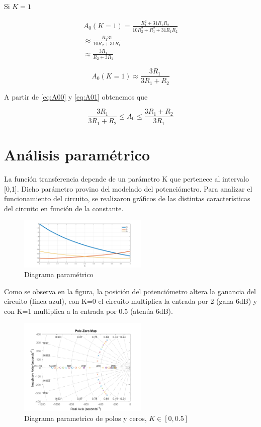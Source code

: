 \documentclass[../../tc_tp3_main.tex]{subfiles}
\begin{document}
Si $K=1$

\begin{equation}
\begin{split}
A_0(K=1) =\frac{R_1^2 + 31R_1 R_2}{10 R_2^2 +R_1^2+31R_1 R_2} \\
\approx \frac{R_1 31}{10 R_2 + 31 R_1} \\
 \approx \frac{3 R_1}{R_2 + 3 R_1}
\end{split}
\end{equation}

\begin{equation}
A_0(K=1) \approx \frac {3R_1}{3R_1 + R_2}\label{eq:A01}
\end{equation}

A partir de \ref{eq:A00} y \ref{eq:A01} obtenemos que

\begin{equation}
\frac {3R_1}{3R_1 + R_2} \leq A_0  \leq \frac{3R_1 + R_2}{3R_1}\label{eq:rangoA}
\end{equation}



\section{Análisis paramétrico}


La función transferencia depende de un parámetro K que pertenece al intervalo [0,1]. Dicho parámetro provino del modelado del potenciómetro. Para analizar el funcionamiento del circuito, se realizaron gráficos de las distintas características del circuito en función de la constante.

\begin{figure}[H]
\centering
\includegraphics[width=0.55\textwidth]{imagenes/param.png}
\caption{Diagrama param\'etrico} 
\end{figure}

Como se observa en la figura, la posición del potenciómetro altera la ganancia del circuito (linea azul), con K=0 el circuito multiplica la entrada por 2 (gana 6dB) y con K=1 multiplica a la entrada por 0.5 (atenúa 6dB).



\begin{figure}[H]
\centering
\includegraphics[width=0.55\textwidth]{imagenes/param005.png}
\caption{Diagrama parametrico de polos y ceros, $K\in [0,0.5]$} 
\end{figure}
\end{document}

